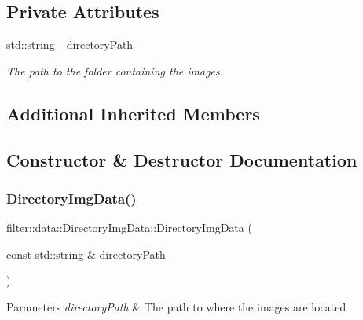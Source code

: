 \subsection*{Private Attributes}
\begin{DoxyCompactItemize}
\item 
\mbox{\label{classfilter_1_1data_1_1_directory_img_data_a21b17cc7584d78b5696d74e4227c2bc7}} 
std\+::string \hyperlink{classfilter_1_1data_1_1_directory_img_data_a21b17cc7584d78b5696d74e4227c2bc7}{\+\_\+directory\+Path}
\begin{DoxyCompactList}\small\item\em The path to the folder containing the images. \end{DoxyCompactList}\end{DoxyCompactItemize}
\subsection*{Additional Inherited Members}


\subsection{Constructor \& Destructor Documentation}
\mbox{\label{classfilter_1_1data_1_1_directory_img_data_a7005a24110c2fe7de63a13bd4a082074}} 
\subsubsection{\texorpdfstring{Directory\+Img\+Data()}{DirectoryImgData()}}
{\footnotesize\ttfamily filter\+::data\+::\+Directory\+Img\+Data\+::\+Directory\+Img\+Data (\begin{DoxyParamCaption}\item[{const std\+::string \&}]{directory\+Path }\end{DoxyParamCaption})\hspace{0.3cm}{\ttfamily [inline]}}


\begin{DoxyParams}{Parameters}
{\em directory\+Path} & The path to where the images are located \\
\hline
\end{DoxyParams}


